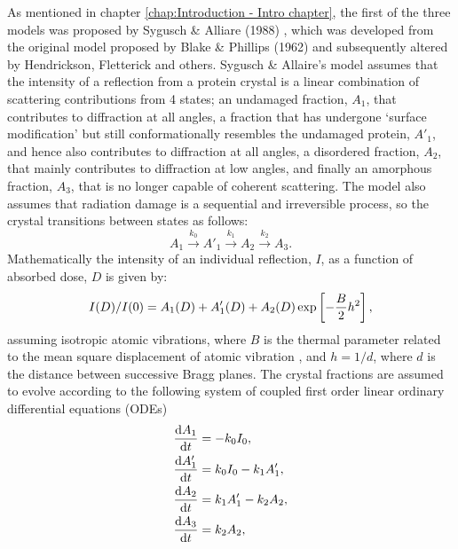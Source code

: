 As mentioned in chapter \ref{chap:Introduction - Intro chapter}, the first of the three models was proposed by Sygusch \& Alliare (1988) \cite{sygusch1988}, which was developed from the original model proposed by Blake \& Phillips (1962) \cite{blake1962} and subsequently altered by Hendrickson, Fletterick and others.
Sygusch \& Allaire's model assumes that the intensity of a reflection from a protein crystal is a linear combination of scattering contributions from 4 states; an undamaged fraction, $A_1$, that contributes to diffraction at all angles, a fraction that has undergone `surface modification' but still conformationally resembles the undamaged protein, $A'_1$, and hence also contributes to diffraction at all angles, a disordered fraction, $A_2$, that mainly contributes to diffraction at low angles, and finally an amorphous fraction, $A_3$, that is no longer capable of coherent scattering.
The model also assumes that radiation damage is a sequential and irreversible process, so the crystal transitions between states as follows:
\begin{equation}
	A_1 \xrightarrow{k_0} A'_1 \xrightarrow{k_1} A_2 \xrightarrow{k_2} A_3.
\end{equation}
Mathematically the intensity of an individual reflection, $I$, as a function of absorbed dose, $D$ is given by:
\begin{equation}
I(D)/I(0) = A_1(D) + A'_1(D) + A_2(D) \exp \left[ -\frac{B}{2}h^2\right],
\label{eq: Sygusch and Allaire DDM}
\end{equation}
assuming isotropic atomic vibrations, where $B$ is the thermal parameter related to the mean square displacement of atomic vibration \cite{drenth1999}, and $h = 1/d$, where $d$ is the distance between successive Bragg planes.
\newline
The crystal fractions are assumed to evolve according to the following system of coupled first order linear ordinary differential equations (ODEs)
\begin{subequations}
	\begin{align}
		\frac{\mathrm{d}A_1}{\mathrm{d}t}  &= - k_0 I_0,                        \\
		\frac{\mathrm{d}A'_1}{\mathrm{d}t} &=   k_0 I_0  - k_1 A'_1,            \\
		\frac{\mathrm{d}A_2}{\mathrm{d}t}  &=              k_1 A'_1  - k_2 A_2, \\
		\frac{\mathrm{d}A_3}{\mathrm{d}t}  &=                          k_2 A_2,
	\end{align}
\label{eq:ODE system Syg and All}
\end{subequations}
